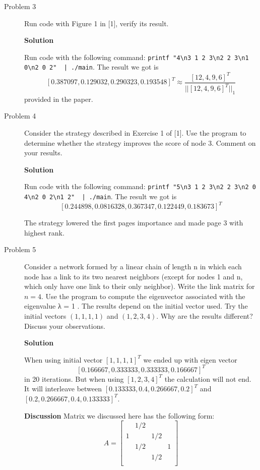 \documentclass{article}
\begin{document}
\begin{description}
	\item[Problem 3] Run code with Figure 1 in [1], verify its result.

	      \textbf{Solution}

	      Run code with the following command: \lstinline{printf "4\n3 1 2 3\n2 2 3\n1 0\n2 0 2"  | ./main}.
	      The result we got is
	      $$[0.387097, 0.129032, 0.290323, 0.193548]^T \approx \frac{[12, 4, 9, 6]^T}{||[12, 4, 9, 6]^T||_1} $$
	      provided in the paper.



	\item[Problem 4] Consider the strategy described in Exercise 1 of [1].
	      Use the program to determine whether the strategy improves the score of node 3.
	      Comment on your results.

	      \textbf{Solution}

	      Run code with the following command: \lstinline{printf "5\n3 1 2 3\n2 2 3\n2 0 4\n2 0 2\n1 2"  | ./main}.
	      The result we got is
	      $$[0.244898, 0.0816328, 0.367347, 0.122449, 0.183673]^T$$

	      The strategy lowered the first pages importance and made page 3 with highest rank.


	\item[Problem 5] Consider a network formed by a linear chain of length n in which each node has a link to its two nearest neighbors
	      (except for nodes 1 and n, which only have one link to their only neighbor).
	      Write the link matrix for $n=4$. Use the program to compute the eigenvector associated with the eigenvalue λ = 1 .
	      The results depend on the initial vector used.
	      Try the initial vectors $(1,1,1,1)$ and $(1,2,3,4)$.
	      Why are the results different? Discuss your observations.

	      \textbf{Solution}

	      When using initial vector $[1, 1, 1, 1]^T$ we ended up with eigen vector
	      $$[0.166667, 0.333333, 0.333333, 0.166667]^T$$
	      in 20 iterations.
	      But when using $[1,2,3,4]^T$ the calculation will not end.
	      It will interleave between $[0.133333, 0.4, 0.266667, 0.2]^T$ and $[0.2, 0.266667, 0.4, 0.133333]^T$.

	      \textbf{Discussion}
	      Matrix we discussed here has the following form:
	      \begin{equation*}
		      A = \begin{bmatrix}
			        & 1/2 &     &   \\
			      1 &     & 1/2 &   \\
			        & 1/2 &     & 1 \\
			        &     & 1/2 &   \\
		      \end{bmatrix}
	      \end{equation*}


\end{description}
\end{document}
